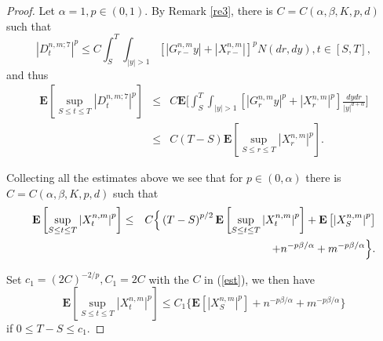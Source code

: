\documentclass[11pt]{amsart}
\theoremstyle{plain}
\numberwithin{equation}{section}
\begin{document}
\begin{proof}
Let $\alpha =1,p\in \left( 0,1\right) $. By Remark \ref{re3}, there is $C=C\left( \alpha ,\beta ,K,p,d\right) $ such that\begin{equation*}
\left\vert D_{t}^{n,m;7}\right\vert ^{p}\leq C\int_{S}^{T}\int_{\left\vert
y\right\vert >1}[\left\vert G_{r-}^{n,m}y\right\vert +\left\vert
X_{r-}^{n,m}\right\vert ]^{p}N\left( dr,dy\right) ,t\in \left[ S,T\right] ,
\end{equation*}and thus 
\begin{eqnarray*}
\mathbf{E}\left[ \sup_{S\leq t\leq T}\left\vert D_{t}^{n,m;7}\right\vert ^{p}\right] &\leq &C\mathbf{E}\Big[\int_{S}^{T}\int_{\left\vert y\right\vert
>1}[\left\vert G_{r}^{n,m}y\right\vert ^{p}+\left\vert
X_{r}^{n,m}\right\vert ^{p}]\frac{dydr}{\left\vert y\right\vert ^{d+\alpha }}\Big] \\
&\leq &C\left( T-S\right) \mathbf{E}\left[ \sup_{S\leq r\leq T}\left\vert
X_{r}^{n,m}\right\vert ^{p}\right] .
\end{eqnarray*}

Collecting all the estimates above we see that for $p\in \left( 0,\alpha
\right) $ there is $C=C\left( \alpha ,\beta ,K,p,d\right) $ such that 
\begin{eqnarray}
\mathbf{E}\left[ \sup_{S\leq t\leq T}\left\vert X_{t}^{n,m}\right\vert ^{p}\right] &\leq &C\Big\{\left( T-S\right) ^{p/2}\mathbf{E}\left[ \sup_{S\leq
t\leq T}\left\vert X_{t}^{n,m}\right\vert ^{p}\right] +\mathbf{E}\left[
\left\vert X_{S}^{n,m}\right\vert ^{p}\right]  \notag \\
&&+n^{-p\beta /\alpha }+m^{-p\beta /\alpha }\Big\}.  \label{est}
\end{eqnarray}

Set $c_{1}=\left( 2C\right) ^{-2/p},C_{1}=2C$ with the $C$ in (\ref{est}),
we then have 
\begin{equation*}
\mathbf{E}\left[ \sup_{S\leq t\leq T}\left\vert X_{t}^{n,m}\right\vert ^{p}\right] \leq C_{1}\Big\{\mathbf{E}\left[ \left\vert X_{S}^{n,m}\right\vert
^{p}\right] +n^{-p\beta /\alpha }+m^{-p\beta /\alpha }\Big\}
\end{equation*}if $0\leq T-S\leq c_{1}$.


\end{proof}
\end{document}
